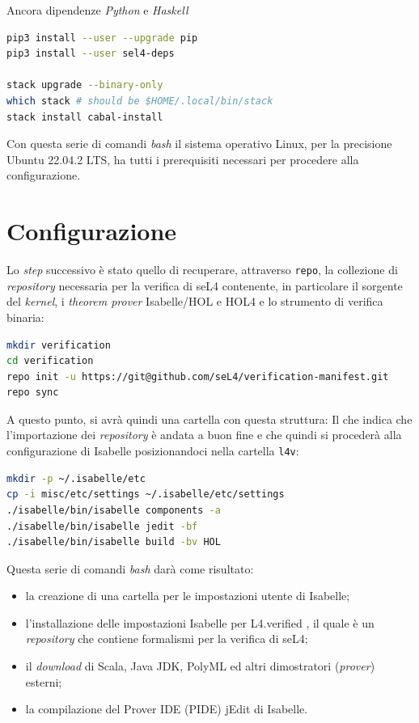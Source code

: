 Ancora dipendenze \textit{Python} e \textit{Haskell}
\begin{lstlisting}[language=bash]
pip3 install --user --upgrade pip
pip3 install --user sel4-deps

stack upgrade --binary-only
which stack # should be $HOME/.local/bin/stack
stack install cabal-install
\end{lstlisting}

Con questa serie di comandi \textit{bash} il sistema operativo Linux, per la precisione Ubuntu 22.04.2 LTS, ha tutti i prerequisiti necessari per procedere alla configurazione.

\section{Configurazione}
Lo \textit{step} successivo è stato quello di recuperare, attraverso \texttt{repo}, la collezione di \textit{repository} necessaria per la verifica di seL4 contenente, in particolare il sorgente del \textit{kernel}, i \textit{theorem prover} Isabelle/HOL e HOL4 e lo strumento di verifica binaria:
\begin{lstlisting}[language=bash]
mkdir verification
cd verification
repo init -u https://git@github.com/seL4/verification-manifest.git
repo sync
\end{lstlisting}

A questo punto, si avrà quindi una cartella con questa struttura:
Il che indica che l'importazione dei \textit{repository} è andata a buon fine e che quindi si procederà alla configurazione di Isabelle posizionandoci nella cartella \texttt{l4v}:
\begin{lstlisting}[language=bash]
mkdir -p ~/.isabelle/etc
cp -i misc/etc/settings ~/.isabelle/etc/settings
./isabelle/bin/isabelle components -a
./isabelle/bin/isabelle jedit -bf
./isabelle/bin/isabelle build -bv HOL
\end{lstlisting}

Questa serie di comandi \textit{bash} darà come risultato:
\begin{itemize}
	\item la creazione di una cartella per le impostazioni utente di Isabelle;
	\item l'installazione delle impostazioni Isabelle per L4.verified \cite{l4v}, il quale è un \textit{repository} che contiene formalismi per la verifica di seL4;
	\item il \textit{download} di Scala, Java JDK, PolyML ed altri dimostratori (\textit{prover}) esterni;
	\item la compilazione del Prover IDE (PIDE) jEdit di Isabelle.
\end{itemize} 

